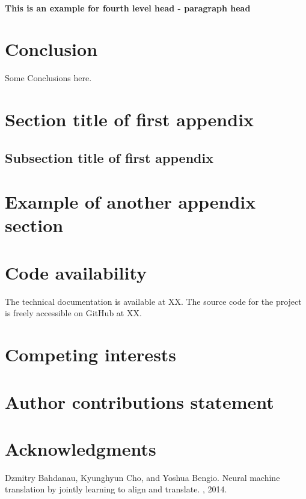 \documentclass[unnumsec,webpdf,contemporary,large]{oup-authoring-template}%
\theoremstyle{thmstyleone}%
\theoremstyle{thmstyletwo}%
\theoremstyle{thmstylethree}%
\begin{document}
\paragraph{This is an example for fourth level head - paragraph head}

\section{Conclusion}

Some Conclusions here.


\begin{appendices}

\section{Section title of first appendix}\label{sec11}

\subsection{Subsection title of first appendix}\label{subsec4}

\section{Example of another appendix section}\label{sec13}%

\end{appendices}

\section{Code availability}
The technical documentation is available at XX. The source code for the project is freely accessible on GitHub at XX.

\section{Competing interests}

\section{Author contributions statement}

\section{Acknowledgments}

\begin{thebibliography}{10}
Dzmitry Bahdanau, Kyunghyun Cho, and Yoshua Bengio.
\newblock Neural machine translation by jointly learning to align and
  translate.
, 2014.
\end{thebibliography}
\end{document}
